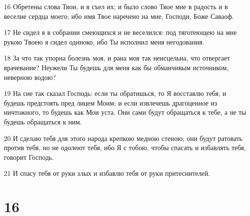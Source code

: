\par 16 Обретены слова Твои, и я съел их; и было слово Твое мне в радость и в веселие сердца моего; ибо имя Твое наречено на мне, Господи, Боже Саваоф.
\par 17 Не сидел я в собрании смеющихся и не веселился: под тяготеющею на мне рукою Твоею я сидел одиноко, ибо Ты исполнил меня негодования.
\par 18 За что так упорна болезнь моя, и рана моя так неисцельна, что отвергает врачевание? Неужели Ты будешь для меня как бы обманчивым источником, неверною водою?
\par 19 На сие так сказал Господь: если ты обратишься, то Я восставлю тебя, и будешь предстоять пред лицем Моим; и если извлечешь драгоценное из ничтожного, то будешь как Мои уста. Они сами будут обращаться к тебе, а не ты будешь обращаться к ним.
\par 20 И сделаю тебя для этого народа крепкою медною стеною; они будут ратовать против тебя, но не одолеют тебя, ибо Я с тобою, чтобы спасать и избавлять тебя, говорит Господь.
\par 21 И спасу тебя от руки злых и избавлю тебя от руки притеснителей.

\chapter{16}

